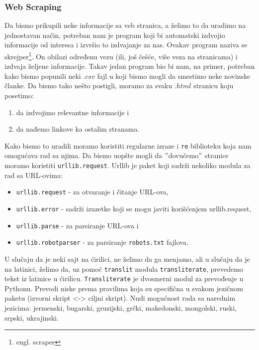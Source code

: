 \documentclass[a4paper]{article}
\begin{document}
\subsubsection{Web Scraping} 
Da bismo prikupili neke informacije sa veb stranica, a želimo to da uradimo na jednostavan način, potreban nam je program koji bi automatski izdvojio informacije od interesa i izvršio to izdvajanje za nas. Ovakav program naziva se skrejper\footnote{engl. scraper}. On obilazi određenu vezu (ili, još češće, više veza na stranicama) i izdvaja željene informacije. Takav jedan program bio bi nam, na primer, potreban kako bismo popunili neki $.csv$ fajl u koji bismo mogli da smestimo neke novinske članke. Da bismo tako nešto postigli, moramo za svaku $.html$ stranicu koju posetimo:
\begin{enumerate}
\item da izdvojimo relevantne informacije i
\item da nađemo linkove ka ostalim stranama.
\end{enumerate}
Kako bismo to uradili moramo koristiti regularne izraze i \texttt{re} biblioteku koja nam omogućava rad sa njima. Da bismo uopšte mogli da $"$dovučemo$"$ stranice moramo koristiti \texttt{urllib.request}. 
Urllib je paket koji sadrži nekoliko modula za rad sa URL-ovima:
\begin{itemize}
\item \texttt{urllib.request} - za otvaranje i čitanje URL-ova,
\item \texttt{urllib.error} - sadrži izuzetke koji se mogu javiti korišćenjem urllib.request,
\item \texttt{urllib.parse} - za parsiranje URL-ova i 
\item \texttt{urllib.robotparser} - za parsiranje \texttt{robots.txt} fajlova.
\end{itemize}
U slučaju da je neki sajt na ćirilici, ne želimo da ga menjamo, ali u slučaju da je na latinici, želimo da, uz pomoć \texttt{translit} modula \texttt{transliterate}, prevedemo tekst iz latinice u ćirilicu. \texttt{Transliterate} je dvosmerni modul za prevođenje u Pythonu. Prevodi niske prema pravilima koja su specifična u svakom jezičnom paketu (izvorni skript <-> ciljni skript). Nudi mogućnost rada sa narednim jezicima: jermenski, bugarski, gruzijski, grčki, makedonski, mongolski, ruski, srpski, ukrajinski.  
\end{document}
